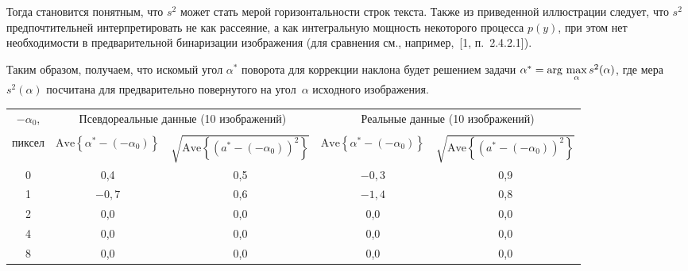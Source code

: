 \begin{multicols}{2}
      Тогда становится понятным, что $s^2$ может стать мерой горизонтальности строк 
текста. Также из приведенной иллюстрации следует, что $s^2$ предпочтительней 
интерпретировать не как рассеяние, а как интегральную мощность некоторого процесса 
$p(y)$, при этом нет необходимости в предварительной бинаризации изображения (для 
сравнения см., например,~[1, п.~2.4.2.1]). 


      
      Таким образом, получаем, что искомый угол $\alpha^*$ поворота для коррекции 
наклона будет решением задачи $\alpha^*\hm=\mathrm{arg}\,\max\limits_\alpha s^2(\alpha)$, 
где мера $s^2(\alpha)$ посчитана для предварительно повернутого на угол~$\alpha$ 
исходного изображения.
\begin{table*}\small
\begin{center}
\vspace*{2ex}

\begin{tabular}{|c|c|c|c|c|}
\hline
$-\alpha_0$, &\multicolumn{2}{c|}{Псевдореальные данные (10 
изображений)}&\multicolumn{2}{c|}{Реальные данные (10 изображений)}\\
\cline{2-5}
&&&&\\[-9pt]
пиксел&$\mathrm{Ave} \left\{ \alpha^*-(-\alpha_0)\right\}$&$\sqrt{\mathrm{Ave}\left\{ (a^*-(-
\alpha_0))^2\right\}}$&$\mathrm{Ave} \left\{ \alpha^*-(-\alpha_0)\right\}$&$\sqrt{\mathrm{Ave}\left\{ (a^*-(-
\alpha_0))^2\right\}}$\\
\hline
0&0,4&0,5&$-0{,}3$\hphantom{$-$}&0,9\\
1&$-0{,}7$\hphantom{$-$}&0,6&$-1{,}4$\hphantom{$-$}&0,8\\
2&0,0&0,0&0,0&0,0\\
4&0,0&0,0&0,0&0,0\\
8&0,0&0,0&0,0&0,0\\
\hline
\end{tabular}
\end{center}
\end{table*}
      

\end{multicols}
